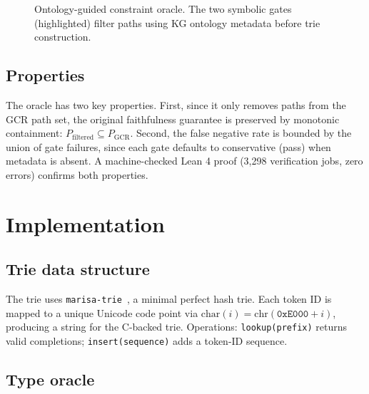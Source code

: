 \documentclass[11pt,twoside]{article}
\begin{document}
\begin{figure}[t]
	\caption{Ontology-guided constraint oracle. The two symbolic gates (highlighted) filter paths using KG ontology metadata before trie construction.}
	\label{fig:architecture}
\end{figure}

\subsection{Properties}

The oracle has two key properties. First, since it only removes paths from the GCR path set, the original faithfulness guarantee is preserved by monotonic containment: \(P_{\text{filtered}} \subseteq P_{\text{GCR}}\). Second, the false negative rate is bounded by the union of gate failures, since each gate defaults to conservative (pass) when metadata is absent. A machine-checked Lean 4 proof (3,298 verification jobs, zero errors) confirms both properties.

\section{Implementation}
\label{sec:impl}

\subsection{Trie data structure}

The trie uses \texttt{marisa-trie}~\citep{marisatrie}, a minimal perfect hash trie. Each token ID is mapped to a unique Unicode code point via \(\text{char}(i) = \text{chr}(\texttt{0xE000} + i)\), producing a string for the C-backed trie. Operations: \texttt{lookup(prefix)} returns valid completions; \texttt{insert(sequence)} adds a token-ID sequence.

\subsection{Type oracle}
\end{document}
